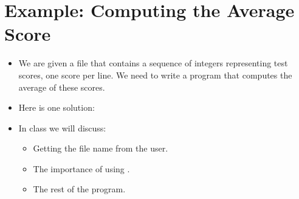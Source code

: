 \documentclass[letterpaper,10pt,english]{sphinxmanual}
\begin{document}
\section{Example: Computing the Average Score}
\label{\detokenize{lecture_notes/lec13_files_web:example-computing-the-average-score}}\begin{itemize}
\item {} 
We are given a file that contains a sequence of integers
representing test scores, one score per line. We need to write a
program that computes the average of these scores.

\item {} 
Here is one solution:

\begin{sphinxVerbatim}[commandchars=\\\{\}]
  
      

  
  
   
      
      

  
\end{sphinxVerbatim}

\item {} 
In class we will discuss:
\begin{itemize}
\item {} 
Getting the file name from the user.

\item {} 
The importance of using .

\item {} 
The rest of the program.

\end{itemize}

\end{itemize}
\end{document}
